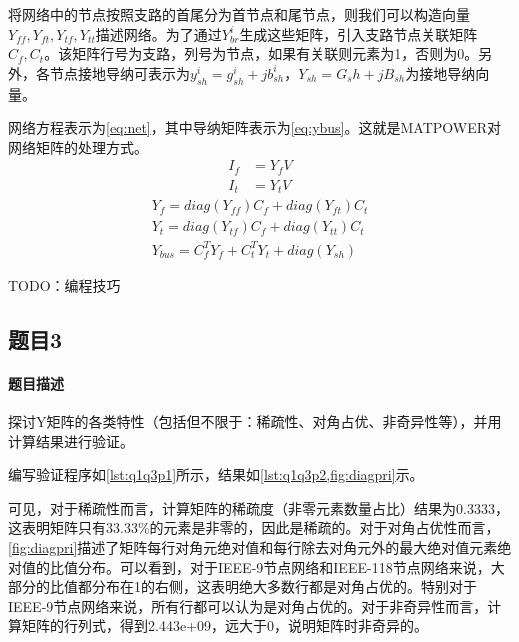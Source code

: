 \documentclass[a4paper,12pt]{article}
\begin{document}
    将网络中的节点按照支路的首尾分为首节点和尾节点，则我们可以构造向量$Y_{ff},Y_{ft},Y_{tf},Y_{tt}$描述网络。为了通过$Y_{br}^i$生成这些矩阵，引入支路节点关联矩阵$C_f, C_t$。该矩阵行号为支路，列号为节点，如果有关联则元素为1，否则为0。另外，各节点接地导纳可表示为$y_{sh}^i=g_{sh}^i+j b_{sh}^i$，$Y_{sh}=G_sh+jB_{sh}$为接地导纳向量。

    网络方程表示为\cref{eq:net}，其中导纳矩阵表示为\cref{eq:ybus}。这就是MATPOWER对网络矩阵的处理方式。
    \begin{equation}
      \label{eq:net}
      \begin{aligned}
        I_f &= Y_f V \\
        I_t &= Y_t V
      \end{aligned}
    \end{equation}
    \begin{equation}
      \label{eq:ybus}
      \begin{aligned}
          Y_f = diag(Y_{ff})C_f+diag(Y_{ft})C_t\\
          Y_t = diag(Y_{tf})C_f+diag(Y_{tt})C_t\\
          Y_{bus} = C_f^TY_f+C_t^TY_t+diag(Y_{sh})
      \end{aligned}
    \end{equation}

    TODO：编程技巧
    \subsection{题目3}
    \paragraph{题目描述} 探讨Y矩阵的各类特性（包括但不限于：稀疏性、对角占优、非奇异性等），并用计算结果进行验证。

    编写验证程序如\cref{lst:q1q3p1}所示，结果如\cref{lst:q1q3p2,fig:diagpri}示。

    可见，对于稀疏性而言，计算矩阵的稀疏度（非零元素数量占比）结果为0.3333，这表明矩阵只有33.33\%的元素是非零的，因此是稀疏的。对于对角占优性而言，\cref{fig:diagpri}描述了矩阵每行对角元绝对值和每行除去对角元外的最大绝对值元素绝对值的比值分布。可以看到，对于IEEE-9节点网络和IEEE-118节点网络来说，大部分的比值都分布在1的右侧，这表明绝大多数行都是对角占优的。特别对于IEEE-9节点网络来说，所有行都可以认为是对角占优的。对于非奇异性而言，计算矩阵的行列式，得到2.443e+09，远大于0，说明矩阵时非奇异的。
\end{document}
